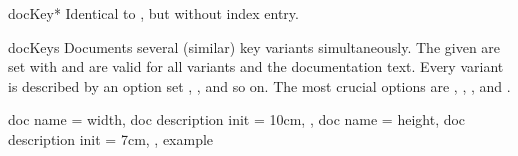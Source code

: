\begin{docEnvironment}[doclang/environment content=key description,doc updated=2020-04-22]
    {docKey*}{}
  Identical to , but without index entry.
\end{docEnvironment}


\begin{docEnvironment}[doclang/environment content=key description,doc new=2020-04-22]
    {docKeys}{}
  Documents several (similar) key variants simultaneously.
  The given  are set with  and are valid for
  all variants and the documentation text.
  Every variant is described by an option set , , and so on.
  The most crucial options are
  , , ,
  and .
\begin{dispExample}
\begin{docKeys}[
    doc no index,   %
    doc keypath           = mykeyroot,
    doc parameter eq meta = length,
  ]
  {
    {
      doc name             = width,
      doc description init = 10cm,
    },
    {
      doc name             = height,
      doc description init = 7cm,
    },
  }
  example
\end{docKeys}
\end{dispExample}
\end{docEnvironment}


